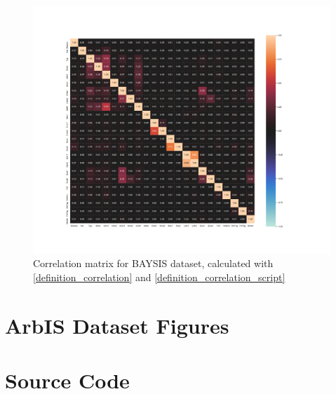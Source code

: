 \documentclass[a4paper,12pt]{report}
\newcommand{\nocontentsline}[3]{}
\newcommand{\tocless}[2]{\bgroup\let\addcontentsline=\nocontentsline#1{#2}\egroup}
\begin{document}
\begin{appendices}
\tocless\section{}
\label{appendix_baysis_dataset_corr_theils}
\begin{figure}[H]
	\centering
	\includegraphics[scale=0.3]{../CorrAnalysis/data/BAYSIS/dataset/plots/baysis_dataset_corr_theils}
	\caption{Correlation matrix for BAYSIS dataset, calculated with \ref{definition_correlation} and \ref{definition_correlation_script}}
	\label{img:appendix_correlation_matrix_dataset}
\end{figure}


\chapter{ArbIS Dataset Figures}
\tocless\section{Figure Name}
\label{appendix_TODO}

\chapter{Source Code}

\tocless\section{CongstatsClusterAlgorithm}
\label{appendix_TODO}

\begingroup
%		
\endgroup
\restoregeometry

\end{appendices}
\end{document}
